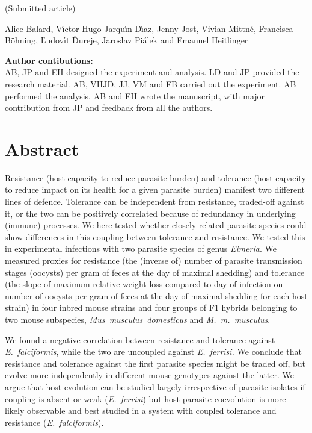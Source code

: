 (Submitted article) \par

Alice Balard, V{\'{\i}}ctor Hugo Jarqu{\'{\i}}n-D{\'{\i}}az, Jenny Jost, Vivian Mittné, Francisca Böhning, {\v{L}}udov{\'{\i}}t {\v{D}}ureje, Jaroslav Pi{\'{a}}lek and Emanuel Heitlinger \par

\textbf{Author contibutions:}\\
AB, JP and EH designed the experiment and analysis. LD and JP provided the research material. AB, VHJD, JJ, VM and FB carried out the experiment. AB performed the analysis. AB and EH wrote the manuscript, with major contribution from JP and feedback from all the authors. \par

\newpage

\section{Abstract}
Resistance (host capacity to reduce parasite burden) and tolerance (host capacity to reduce impact on its health for a given parasite burden) manifest two different lines of defence. Tolerance can be independent from resistance, traded-off against it, or the two can be positively correlated because of redundancy in underlying (immune) processes. We here tested whether closely related parasite species could show differences in this coupling between tolerance and resistance. 
We tested this in experimental infections with two parasite species of genus \textit{Eimeria}. We measured proxies for resistance (the (inverse of) number of parasite transmission stages (oocysts) per gram of feces at the day of maximal shedding) and tolerance (the slope of maximum relative weight loss compared to day of infection on number of oocysts per gram of feces at the day of maximal shedding for each host strain) in four inbred mouse strains and four groups of F1 hybrids belonging to two mouse subspecies, \textit{Mus~musculus~domesticus} and \textit{M.~m.~musculus}.

We found a negative correlation between resistance and tolerance against \textit{E.~falciformis}, while the two are uncoupled against \textit{E.~ferrisi.} We conclude that resistance and tolerance against the first parasite species might be traded off, but evolve more independently in different mouse genotypes against the latter. We argue that host evolution can be studied largely irrespective of parasite isolates if coupling is absent or weak (\textit{E.~ferrisi}) but host-parasite coevolution is more likely observable and best studied in a system with coupled tolerance and resistance (\textit{E.~falciformis}). 

